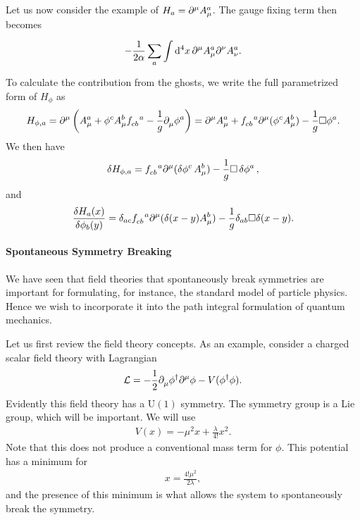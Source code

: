 Let us now consider the example of $H_{a} = \partial^{\mu}_{}A_{\mu}^{a}$. The gauge fixing term then becomes
\begin{align*}
	-\frac{1}{2\alpha}\sum\limits_{a}\int\limits_{}^{}\dd[4]{x}\partial^{\mu}_{}A_{\mu}^{a}\partial^{\nu}_{}A_{\nu}^{a}.
\end{align*}
To calculate the contribution from the ghosts, we write the full parametrized form of $H_{\phi}$ as
\begin{align*}
	H_{\phi, a} = \del{\mu}{}\left(A_{\mu}^{a} + \phi^{c}A_{\mu}^{b}\srconst{cb}{a} - \frac{1}{g}\del{}{\mu}\phi^{a}\right) = \del{\mu}{}A_{\mu}^{a} + \srconst{cb}{a}\del{\mu}{}(\phi^{c}A_{\mu}^{b}) - \frac{1}{g}\dalem\phi^{a}.
\end{align*}
We then have
\begin{align*}
	\var{H_{\phi, a}} = \srconst{cb}{a}\del{\mu}{}(\var{\phi^{c}}A_{\mu}^{b}) - \frac{1}{g}\dalem\var{\phi^{a}},
\end{align*}
and
\begin{align*}
	\fdv{H_{a}(x)}{\phi_{b}(y)} = \delta_{ac}\srconst{cb}{a}\del{\mu}{}(\delta(x - y)A_{\mu}^{b}) - \frac{1}{g}\delta_{ab}\dalem\delta(x - y).
\end{align*}

\paragraph{Spontaneous Symmetry Breaking}
We have seen that field theories that spontaneously break symmetries are important for formulating, for instance, the standard model of particle physics. Hence we wish to incorporate it into the path integral formulation of quantum mechanics.

Let us first review the field theory concepts. As an example, consider a charged scalar field theory with Lagrangian
\begin{align*}
	\mathcal{L} = -\frac{1}{2}\partial^{}_{\mu}\phi^{\dagger}\partial^{\mu}_{}\phi - V(\phi^{\dagger}\phi).
\end{align*}
Evidently this field theory has a $\text{U}(1)$ symmetry. The symmetry group is a Lie group, which will be important. We will use
\begin{align*}
	V(x) = -\mu^{2}x + \frac{\lambda}{4!}x^{2}.
\end{align*}
Note that this does not produce a conventional mass term for $\phi$. This potential has a minimum for
\begin{align*}
	x = \frac{4!\mu^{2}}{2\lambda},
\end{align*}
and the presence of this minimum is what allows the system to spontaneously break the symmetry.

